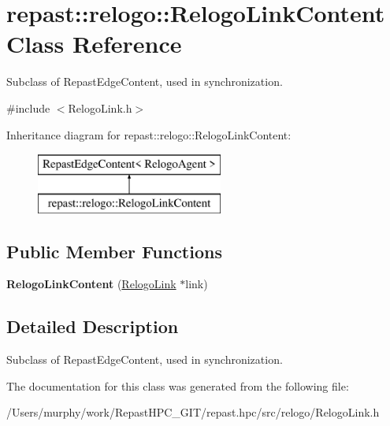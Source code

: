 \hypertarget{classrepast_1_1relogo_1_1_relogo_link_content}{\section{repast\-:\-:relogo\-:\-:Relogo\-Link\-Content Class Reference}
\label{classrepast_1_1relogo_1_1_relogo_link_content}
}


Subclass of Repast\-Edge\-Content, used in synchronization.  




{\ttfamily \#include $<$Relogo\-Link.\-h$>$}

Inheritance diagram for repast\-:\-:relogo\-:\-:Relogo\-Link\-Content\-:\begin{figure}[H]
\begin{center}
\leavevmode
\includegraphics[height=2.000000cm]{classrepast_1_1relogo_1_1_relogo_link_content}
\end{center}
\end{figure}
\subsection*{Public Member Functions}
\begin{DoxyCompactItemize}
\item 
\hypertarget{classrepast_1_1relogo_1_1_relogo_link_content_a88617ac84e9e3b94419c0b240414bf59}{{\bfseries Relogo\-Link\-Content} (\hyperlink{classrepast_1_1relogo_1_1_relogo_link}{Relogo\-Link} $\ast$link)}\label{classrepast_1_1relogo_1_1_relogo_link_content_a88617ac84e9e3b94419c0b240414bf59}

\end{DoxyCompactItemize}


\subsection{Detailed Description}
Subclass of Repast\-Edge\-Content, used in synchronization. 

The documentation for this class was generated from the following file\-:\begin{DoxyCompactItemize}
\item 
/\-Users/murphy/work/\-Repast\-H\-P\-C\-\_\-\-G\-I\-T/repast.\-hpc/src/relogo/Relogo\-Link.\-h\end{DoxyCompactItemize}
